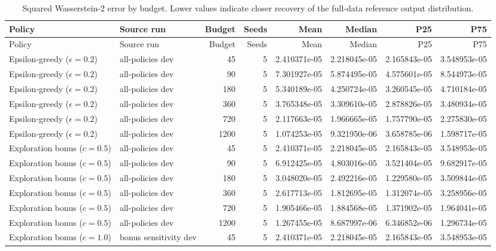 \begin{scriptsize}
\begin{longtable}{llrrrrrr}
\caption{Squared Wasserstein-2 error by budget. Lower values indicate closer recovery of the full-data reference output distribution.}\label{tab:error-by-budget}\\
\toprule
Policy & Source run & Budget & Seeds & Mean & Median & P25 & P75 \\
\midrule
\endfirsthead
\toprule
Policy & Source run & Budget & Seeds & Mean & Median & P25 & P75 \\
\midrule
\endhead
Epsilon-greedy ($\epsilon=0.2$) & all-policies dev & 45 & 5 & 2.410371e-05 & 2.218045e-05 & 2.165843e-05 & 3.548953e-05 \\
Epsilon-greedy ($\epsilon=0.2$) & all-policies dev & 90 & 5 & 7.301927e-05 & 5.874495e-05 & 4.575601e-05 & 8.544973e-05 \\
Epsilon-greedy ($\epsilon=0.2$) & all-policies dev & 180 & 5 & 5.340189e-05 & 4.250724e-05 & 3.260545e-05 & 4.710184e-05 \\
Epsilon-greedy ($\epsilon=0.2$) & all-policies dev & 360 & 5 & 3.765348e-05 & 3.309610e-05 & 2.878826e-05 & 3.480934e-05 \\
Epsilon-greedy ($\epsilon=0.2$) & all-policies dev & 720 & 5 & 2.117663e-05 & 1.966665e-05 & 1.757790e-05 & 2.275830e-05 \\
Epsilon-greedy ($\epsilon=0.2$) & all-policies dev & 1200 & 5 & 1.074253e-05 & 9.321950e-06 & 3.658785e-06 & 1.598717e-05 \\
Exploration bonus ($c=0.5$) & all-policies dev & 45 & 5 & 2.410371e-05 & 2.218045e-05 & 2.165843e-05 & 3.548953e-05 \\
Exploration bonus ($c=0.5$) & all-policies dev & 90 & 5 & 6.912425e-05 & 4.803016e-05 & 3.521404e-05 & 9.682917e-05 \\
Exploration bonus ($c=0.5$) & all-policies dev & 180 & 5 & 3.048020e-05 & 2.492216e-05 & 1.229580e-05 & 3.509844e-05 \\
Exploration bonus ($c=0.5$) & all-policies dev & 360 & 5 & 2.617713e-05 & 1.812695e-05 & 1.312074e-05 & 3.258956e-05 \\
Exploration bonus ($c=0.5$) & all-policies dev & 720 & 5 & 1.905466e-05 & 1.884568e-05 & 1.371902e-05 & 1.964041e-05 \\
Exploration bonus ($c=0.5$) & all-policies dev & 1200 & 5 & 1.267455e-05 & 8.687997e-06 & 6.346852e-06 & 1.296734e-05 \\
Exploration bonus ($c=1.0$) & bonus sensitivity dev & 45 & 5 & 2.410371e-05 & 2.218045e-05 & 2.165843e-05 & 3.548953e-05 \\

\end{longtable}
\end{scriptsize}
